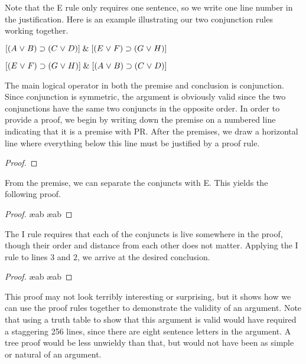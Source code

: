 Note that the {\eand}E rule only requires one sentence, so we write one line number in the justification.
Here is an example illustrating our two conjunction rules working together.
\begin{earg}
\item[] $[(A\mkern1mu\vee\mkern1mu B)\supset(C\mkern1mu\vee\mkern1mu D)] \mathrel\& [(E \mkern1mu\vee\mkern1mu F) \supset (G\mkern1mu\vee\mkern1mu H)]$
\item[\therefore] $[(E \mkern1mu\vee\mkern1mu F) \supset (G\mkern1mu\vee\mkern1mu H)] \mathrel\& [(A\mkern1mu\vee\mkern1mu B)\supset(C\mkern1mu\vee\mkern1mu D)]$
\end{earg}
The main logical operator in both the premise and conclusion is conjunction.
Since conjunction is symmetric, the argument is obviously valid since the two conjunctions have the same two conjuncts in the opposite order.
In order to provide a proof, we begin by writing down the premise on a numbered line indicating that it is a premise with PR.
After the premises, we draw a horizontal line where everything below this line must be justified by a proof rule.
\begin{proof}
	 \pr{}
\end{proof}
From the premise, we can separate the conjuncts with {\eand}E.
This yields the following proof.
\begin{proof}
	 \pr{}
	 \ae{ab}
	 \ae{ab}
\end{proof}
The {\eand}I rule requires that each of the conjuncts is live somewhere in the proof, though their order and distance from each other does not matter.
Applying the {\eand}I rule to lines $3$ and $2$, we arrive at the desired conclusion.

\begin{proof}
	 \pr{}

	 \ae{ab}
	 \ae{ab}
	 
\end{proof}

This proof may not look terribly interesting or surprising, but it shows how we can use the proof rules together to demonstrate the validity of an argument.
Note that using a truth table to show that this argument is valid would have required a staggering 256 lines, since there are eight sentence letters in the argument.
A tree proof would be less unwieldy than that, but would not have been as simple or natural of an argument.




